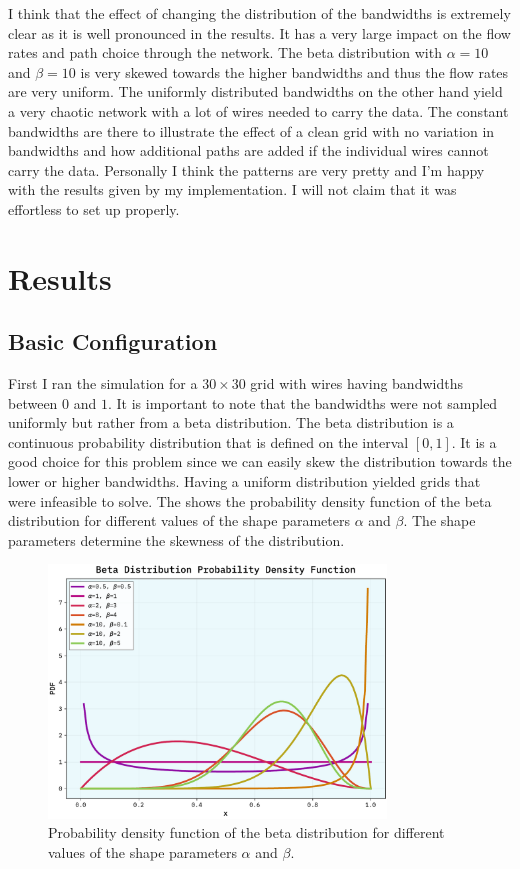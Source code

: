 \documentclass[10pt, titlepage, a4paper]{article}
\begin{document}
I think that the effect of changing the distribution of the bandwidths is extremely clear as it is well pronounced in the
results. It has a very large impact on the flow rates and path choice through the network. The beta distribution with
$\alpha = 10$ and $\beta = 10$ is very skewed towards the higher bandwidths and thus the flow rates are very uniform. The uniformly 
distributed bandwidths on the other hand yield a very chaotic network with a lot of wires needed to carry the data. The constant
bandwidths are there to illustrate the effect of a clean grid with no variation in bandwidths and how additional paths are added if the 
individual wires cannot carry the data. Personally I think the patterns are very pretty and I'm happy with the results given by my implementation.
I will not claim that it was effortless to set up properly. \\


\section{Results}
\subsection{Basic Configuration}
First I ran the simulation for a $30\times 30$ grid with wires having bandwidths between $0$ and $1$. It is important to note 
that the bandwidths were not sampled uniformly but rather from a beta distribution. The beta distribution is a 
continuous probability distribution that is defined on the interval $[0, 1]$. It is a good choice for this problem
since we can easily skew the distribution towards the lower or higher bandwidths. Having a uniform distribution yielded 
grids that were infeasible to solve. The \textcolor{red}{} shows the probability density function
of the beta distribution for different values of the shape parameters $\alpha$ and $\beta$. The shape parameters determine
the skewness of the distribution. 

\begin{figure}[H]
    \centering
    \includegraphics[width=0.8\textwidth]{../Images/beta_dist.pdf}
    \caption{Probability density function of the beta distribution for different values of the shape parameters $\alpha$ and $\beta$.}
    \label{fig:beta_dist}
\end{figure}
\end{document}
